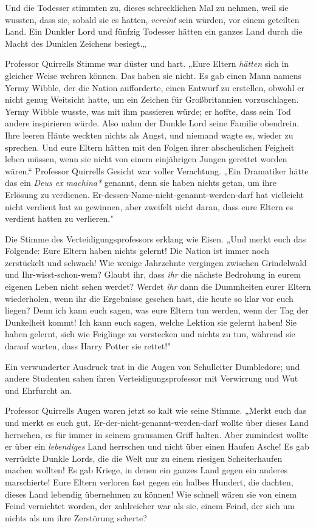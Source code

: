{Und die Todesser stimmten zu, dieses schrecklichen Mal zu nehmen, weil sie wussten, dass sie, sobald sie es hatten, \emph{vereint} sein würden, vor einem geteilten Land. Ein Dunkler Lord und fünfzig Todesser hätten ein ganzes Land durch die Macht des Dunklen Zeichens besiegt.„

Professor Quirrells Stimme war düster und hart. „Eure Eltern \emph{hätten} sich in gleicher Weise wehren können. Das haben sie nicht. Es gab einen Mann namens Yermy Wibble, der die Nation aufforderte, einen Entwurf zu erstellen, obwohl er nicht genug Weitsicht hatte, um ein Zeichen für Großbritannien vorzuschlagen. Yermy Wibble wusste, was mit ihm passieren würde; er hoffte, dass sein Tod andere inspirieren würde. Also nahm der Dunkle Lord seine Familie obendrein. Ihre leeren Häute weckten nichts als Angst, und niemand wagte es, wieder zu sprechen. Und eure Eltern hätten mit den Folgen ihrer abscheulichen Feigheit leben müssen, wenn sie nicht von einem einjährigen Jungen gerettet worden wären.“ Professor Quirrells Gesicht war voller Verachtung. „Ein Dramatiker hätte das ein \emph{Deus ex} \emph{machina*} genannt, denn sie haben nichts getan, um ihre Erlösung zu verdienen. Er-dessen-Name-nicht-genannt-werden-darf hat vielleicht nicht verdient hat zu gewinnen, aber zweifelt nicht daran, dass eure Eltern es verdient hatten zu verlieren."

Die Stimme des Verteidigungsprofessors erklang wie Eisen. „Und merkt euch das Folgende: Eure Eltern haben nichts gelernt! Die Nation ist immer noch zerstückelt und schwach! Wie wenige Jahrzehnte vergingen zwischen Grindelwald und Ihr-wisst-schon-wem? Glaubt ihr, dass \emph{ihr} die nächste Bedrohung in eurem eigenen Leben nicht sehen werdet? Werdet \emph{ihr} dann die Dummheiten eurer Eltern wiederholen, wenn ihr die Ergebnisse gesehen hast, die heute so klar vor euch liegen? Denn ich kann euch sagen, was eure Eltern tun werden, wenn der Tag der Dunkelheit kommt! Ich kann euch sagen, welche Lektion sie gelernt haben! Sie haben gelernt, sich wie Feiglinge zu verstecken und nichts zu tun, während sie darauf warten, dass Harry Potter sie rettet!"

Ein verwunderter Ausdruck trat in die Augen von Schulleiter Dumbledore; und andere Studenten sahen ihren Verteidigungsprofessor mit Verwirrung und Wut und Ehrfurcht an.

Professor Quirrells Augen waren jetzt so kalt wie seine Stimme. „Merkt euch das und merkt es euch gut. Er-der-nicht-genannt-werden-darf wollte über dieses Land herrschen, es für immer in seinem grausamen Griff halten. Aber zumindest wollte er über ein \emph{lebendiges} Land herrschen und nicht über einen Haufen Asche! Es gab verrückte Dunkle Lords, die die Welt nur zu einem riesigen Scheiterhaufen machen wollten! Es gab Kriege, in denen ein ganzes Land gegen ein anderes marschierte! Eure Eltern verloren fast gegen ein halbes Hundert, die dachten, dieses Land lebendig übernehmen zu können! Wie schnell wären sie von einem Feind vernichtet worden, der zahlreicher war als sie, einem Feind, der sich um nichts als um ihre Zerstörung scherte?

}
